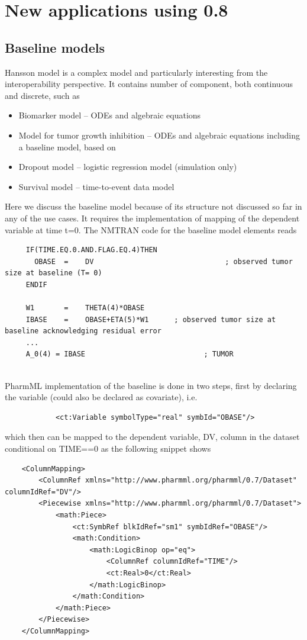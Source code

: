 
\chapter{New applications using 0.8}
\label{ch:074applications}

\section{Baseline models}
\label{sec:baselineMapping}

Hansson model \cite{Hansson:2013yq} is a complex model
and particularly interesting from the interoperability perspective. 
It contains number of component, both continuous and discrete, such as 
\begin{itemize}
\item 
Biomarker model -- ODEs and algebraic equations 
\item
Model for tumor growth inhibition -- ODEs and algebraic equations 
including a baseline model, based on \cite{dansirikul2008approaches}
\item
Dropout model -- logistic regression model (simulation only)
\item
Survival model -- time-to-event data model 
\end{itemize}
Here we discuss the baseline model because of its structure not
discussed so far in any of the use cases. It requires the implementation of
mapping of the dependent variable at time t=0.
The NMTRAN code for the baseline model elements reads
\lstset{language=NM}
\begin{lstlisting}
	 IF(TIME.EQ.0.AND.FLAG.EQ.4)THEN
	   OBASE  =    DV                        		; observed tumor size at baseline (T= 0)
	 ENDIF
	
	 W1       =    THETA(4)*OBASE
	 IBASE    =    OBASE+ETA(5)*W1		; observed tumor size at baseline acknowledging residual error
	 ...
	 A_0(4) = IBASE                            ; TUMOR
	 
\end{lstlisting}
PharmML implementation of the baseline is done in two steps, first
by declaring the variable (could also be declared as covariate), i.e.
\lstset{language=XML}
\begin{lstlisting}
            <ct:Variable symbolType="real" symbId="OBASE"/>
\end{lstlisting}
which then can be mapped to the dependent variable, DV, column in the
dataset conditional on TIME==0 as the following snippet shows
\lstset{language=XML}
\begin{lstlisting}
    <ColumnMapping>
        <ColumnRef xmlns="http://www.pharmml.org/pharmml/0.7/Dataset" columnIdRef="DV"/>
        <Piecewise xmlns="http://www.pharmml.org/pharmml/0.7/Dataset">
            <math:Piece>
                <ct:SymbRef blkIdRef="sm1" symbIdRef="OBASE"/>
                <math:Condition>
                    <math:LogicBinop op="eq">
                        <ColumnRef columnIdRef="TIME"/>
                        <ct:Real>0</ct:Real>
                    </math:LogicBinop>
                </math:Condition>
            </math:Piece>
        </Piecewise>
    </ColumnMapping>
\end{lstlisting}
